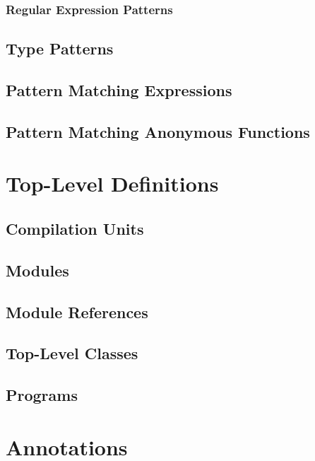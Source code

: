 \subsection{Regular Expression Patterns}

\section{Type Patterns}

\section{Pattern Matching Expressions}

\section{Pattern Matching Anonymous Functions}

\chapter{Top-Level Definitions}

\section{Compilation Units}
\label{sec:compilation-units}

\section{Modules}
\label{sec:modules}

\section{Module References}

\section{Top-Level Classes}

\section{Programs}

\chapter{Annotations}
\label{sec:annotations}

